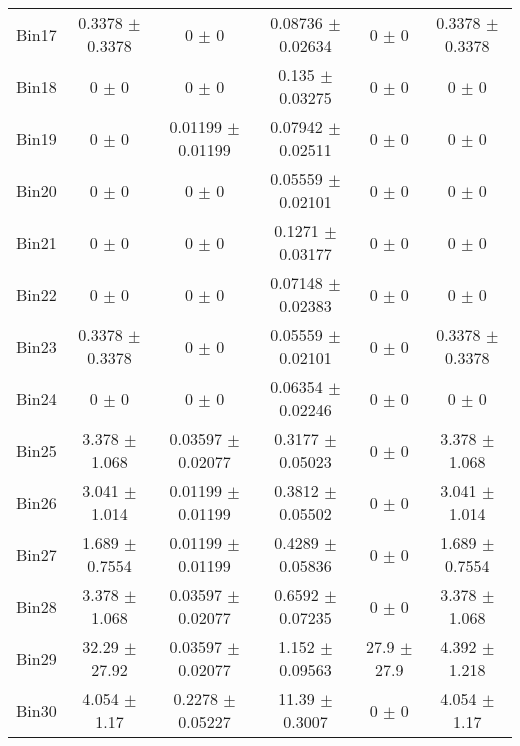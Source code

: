 \begin{tabular}{@{\extracolsep{4pt}}lccccc@{}}
     Bin17 & 0.3378 $\pm$ 0.3378 & 0 $\pm$ 0 & 0.08736 $\pm$ 0.02634 & 0 $\pm$ 0 & 0.3378 $\pm$ 0.3378 \\ 
     Bin18 & 0 $\pm$ 0 & 0 $\pm$ 0 & 0.135 $\pm$ 0.03275 & 0 $\pm$ 0 & 0 $\pm$ 0 \\ 
     Bin19 & 0 $\pm$ 0 & 0.01199 $\pm$ 0.01199 & 0.07942 $\pm$ 0.02511 & 0 $\pm$ 0 & 0 $\pm$ 0 \\ 
     Bin20 & 0 $\pm$ 0 & 0 $\pm$ 0 & 0.05559 $\pm$ 0.02101 & 0 $\pm$ 0 & 0 $\pm$ 0 \\ 
     Bin21 & 0 $\pm$ 0 & 0 $\pm$ 0 & 0.1271 $\pm$ 0.03177 & 0 $\pm$ 0 & 0 $\pm$ 0 \\ 
     Bin22 & 0 $\pm$ 0 & 0 $\pm$ 0 & 0.07148 $\pm$ 0.02383 & 0 $\pm$ 0 & 0 $\pm$ 0 \\ 
     Bin23 & 0.3378 $\pm$ 0.3378 & 0 $\pm$ 0 & 0.05559 $\pm$ 0.02101 & 0 $\pm$ 0 & 0.3378 $\pm$ 0.3378 \\ 
     Bin24 & 0 $\pm$ 0 & 0 $\pm$ 0 & 0.06354 $\pm$ 0.02246 & 0 $\pm$ 0 & 0 $\pm$ 0 \\ 
     Bin25 & 3.378 $\pm$ 1.068 & 0.03597 $\pm$ 0.02077 & 0.3177 $\pm$ 0.05023 & 0 $\pm$ 0 & 3.378 $\pm$ 1.068 \\ 
     Bin26 & 3.041 $\pm$ 1.014 & 0.01199 $\pm$ 0.01199 & 0.3812 $\pm$ 0.05502 & 0 $\pm$ 0 & 3.041 $\pm$ 1.014 \\ 
     Bin27 & 1.689 $\pm$ 0.7554 & 0.01199 $\pm$ 0.01199 & 0.4289 $\pm$ 0.05836 & 0 $\pm$ 0 & 1.689 $\pm$ 0.7554 \\ 
     Bin28 & 3.378 $\pm$ 1.068 & 0.03597 $\pm$ 0.02077 & 0.6592 $\pm$ 0.07235 & 0 $\pm$ 0 & 3.378 $\pm$ 1.068 \\ 
     Bin29 & 32.29 $\pm$ 27.92 & 0.03597 $\pm$ 0.02077 & 1.152 $\pm$ 0.09563 & 27.9 $\pm$ 27.9 & 4.392 $\pm$ 1.218 \\ 
     Bin30 & 4.054 $\pm$ 1.17 & 0.2278 $\pm$ 0.05227 & 11.39 $\pm$ 0.3007 & 0 $\pm$ 0 & 4.054 $\pm$ 1.17 \\ 
\hline\hline
  \end{tabular}
